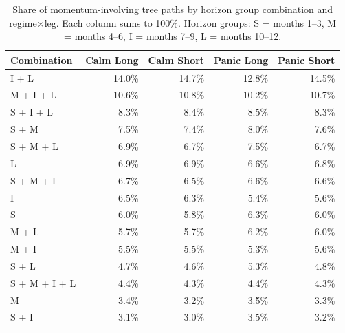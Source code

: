 \begin{table}[H]
\centering
\small
\begin{tabular}{l r r r r}
\toprule
Combination & Calm Long & Calm Short & Panic Long & Panic Short \\
\midrule
I {+} L & 14.0\% & 14.7\% & 12.8\% & 14.5\% \\
M {+} I {+} L & 10.6\% & 10.8\% & 10.2\% & 10.7\% \\
S {+} I {+} L & 8.3\% & 8.4\% & 8.5\% & 8.3\% \\
S {+} M & 7.5\% & 7.4\% & 8.0\% & 7.6\% \\
S {+} M {+} L & 6.9\% & 6.7\% & 7.5\% & 6.7\% \\
L & 6.9\% & 6.9\% & 6.6\% & 6.8\% \\
S {+} M {+} I & 6.7\% & 6.5\% & 6.6\% & 6.6\% \\
I & 6.5\% & 6.3\% & 5.4\% & 5.6\% \\
S & 6.0\% & 5.8\% & 6.3\% & 6.0\% \\
M {+} L & 5.7\% & 5.7\% & 6.2\% & 6.0\% \\
M {+} I & 5.5\% & 5.5\% & 5.3\% & 5.6\% \\
S {+} L & 4.7\% & 4.6\% & 5.3\% & 4.8\% \\
S {+} M {+} I {+} L & 4.4\% & 4.3\% & 4.4\% & 4.3\% \\
M & 3.4\% & 3.2\% & 3.5\% & 3.3\% \\
S {+} I & 3.1\% & 3.0\% & 3.5\% & 3.2\% \\
\bottomrule
\end{tabular}
\caption{Share of momentum-involving tree paths by horizon group combination and regime$\times$leg. Each column sums to 100\%. Horizon groups: S = months 1--3, M = months 4--6, I = months 7--9, L = months 10--12.}
\label{tab:combo_freq}
\end{table}
